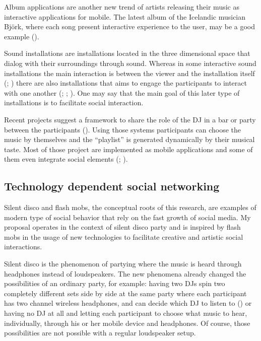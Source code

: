 \documentclass[a4paper,11pt]{article}
\begin{document}
Album applications are another new trend of artists releasing their music as interactive applications for mobile.
The latest album of the Icelandic musician Bj\"{o}rk, where each song present interactive experience to the user, may be a good example (\cite{stimulant13}).

Sound installations are installations located in the three dimensional space that dialog with their surroundings through sound.
Whereas in some interactive sound installations the main interaction is between the viewer and the installation itself (\cite{web:visnjic}; \cite{web:cardiff01}) there are also installations that aims to engage the participants to interact with one another (\cite{eng03}; \cite{web:kirn12}; \cite{web:murray-browne13}).
One may say that the main goal of this later type of installations is to facilitate social interaction.

Recent projects suggest a framework to share the role of the DJ in a bar or party between the participants (\cite{web:shaw}).
Using those systems participants can choose the music by themselves and the ``playlist'' is generated dynamically by their musical taste.
Most of those project are implemented as mobile applications and some of them even integrate social elements (\citeauthor{web:playmysong}; \cite{web:lammers}).

\subsection{Technology dependent social networking}

Silent disco and flash mobs, the conceptual roots of this research, are examples of modern type of social behavior that rely on the fast growth of social media.
My proposal operates in the context of silent disco party and is inspired by flash mobs in the usage of new technologies to facilitate creative and artistic social interactions.

Silent disco is the phenomenon of partying where the music is heard through headphones instead of loudspeakers.
The new phenomena already changed the possibilities of an ordinary party, for example: having two DJs spin two completely different sets side by side at the same party where each participant has two channel wireless headphones, and can decide which DJ to listen to (\citeauthor{web:headphonedisco}) or having no DJ at all and letting each participant to choose what music to hear, individually, through his or her mobile device and headphones.
Of course, those possibilities are not possible with a regular loudspeaker setup.
\end{document}
